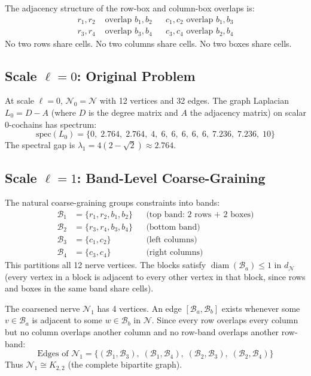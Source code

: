\documentclass[11pt,letterpaper]{article}
\newcommand{\nerve}{\mathcal{N}}
\DeclareMathOperator{\diam}{diam}
\newcommand{\block}{\mathcal{B}}
\begin{document}
The adjacency structure of the row-box and column-box overlaps is:
\begin{align*}
    r_1, r_2 &\text{ overlap } b_1, b_2 
    && c_1, c_2 \text{ overlap } b_1, b_3 \\
    r_3, r_4 &\text{ overlap } b_3, b_4 
    && c_3, c_4 \text{ overlap } b_2, b_4
\end{align*}
No two rows share cells. No two columns share cells. No two boxes 
share cells.

\subsection{Scale $\ell = 0$: Original Problem}

At scale $\ell = 0$, $\nerve_0 = \nerve$ with 12 vertices and 32 
edges. The graph Laplacian $L_0 = D - A$ (where $D$ is the degree 
matrix and $A$ the adjacency matrix) on scalar 0-cochains has 
spectrum:
\begin{equation}\label{eq:shidoku_spectrum_0}
    \mathrm{spec}(L_0) = \{0,\; 2.764,\; 2.764,\; 4,\; 6,\; 6,\; 
    6,\; 6,\; 6,\; 7.236,\; 7.236,\; 10\}
\end{equation}
The spectral gap is $\lambda_1 = 4(2 - \sqrt{2}) \approx 2.764$.

\subsection{Scale $\ell = 1$: Band-Level Coarse-Graining}

The natural coarse-graining groups constraints into bands:
\begin{align*}
    \block_1 &= \{r_1, r_2, b_1, b_2\} 
    && \text{(top band: 2 rows + 2 boxes)} \\
    \block_2 &= \{r_3, r_4, b_3, b_4\} 
    && \text{(bottom band)} \\
    \block_3 &= \{c_1, c_2\} && \text{(left columns)} \\
    \block_4 &= \{c_3, c_4\} && \text{(right columns)}
\end{align*}
This partitions all 12 nerve vertices. The blocks satisfy 
$\diam(\block_a) \leq 1$ in $d_\nerve$ (every vertex in a block 
is adjacent to every other vertex in that block, since rows and 
boxes in the same band share cells).

The coarsened nerve $\nerve_1$ has 4 vertices. An edge 
$[\block_a, \block_b]$ exists whenever some $v \in \block_a$ is 
adjacent to some $w \in \block_b$ in $\nerve$. Since every row 
overlaps every column but no column overlaps another column and 
no row-band overlaps another row-band:
\begin{equation}\label{eq:coarsened_edges}
    \text{Edges of } \nerve_1 = \{(\block_1, \block_3),\; 
    (\block_1, \block_4),\; (\block_2, \block_3),\; 
    (\block_2, \block_4)\}
\end{equation}
Thus $\nerve_1 \cong K_{2,2}$ (the complete bipartite graph).
\end{document}
